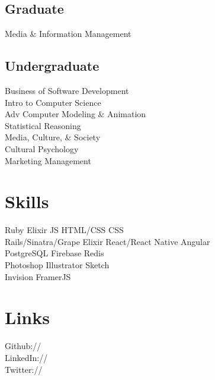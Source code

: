 \documentclass[]{deedy-resume-openfont}
\begin{document}
\begin{minipage}[t]{0.33\textwidth}
\subsection{Graduate}
Media \& Information Management \\
\sectionsep

\subsection{Undergraduate}
Business of Software Development \\
Intro to Computer Science \\
Adv Computer Modeling \& Animation \\
Statistical Reasoning \\
Media, Culture, \& Society \\
Cultural Psychology \\
Marketing Management
\sectionsep


\section{Skills}
Ruby \textbullet{} Elixir \textbullet{} JS \textbullet{} HTML/CSS \textbullet{} CSS \\
Rails/Sinatra/Grape \textbullet{} Elixir \textbullet{} React/React Native \textbullet{} Angular \\
PostgreSQL \textbullet{} Firebase \textbullet{} Redis \\
Photoshop \textbullet{} Illustrator \textbullet{} Sketch \\
Invision \textbullet{} FramerJS \\
\sectionsep


\section{Links} 
Github:// \href{https://github.com/mopineyro}{} \\
LinkedIn://  \href{https://www.linkedin.com/in/manuelopineyro}{} \\
Twitter://  \href{https://twitter.com/mopineyro}{}
\sectionsep

%
%

\end{minipage} 
\end{document}
